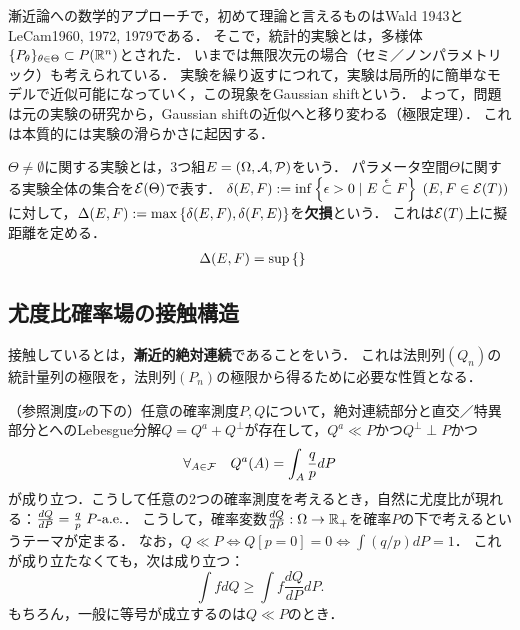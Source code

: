 \documentclass[uplatex,dvipdfmx]{jsreport}
\begin{document}
\begin{history}
    漸近論への数学的アプローチで，初めて理論と言えるものはWald 1943とLeCam1960, 1972, 1979である．
    そこで，統計的実験とは，多様体$\{P_\theta\}_{\theta\in\Theta}\subset P(\mathbb{R}^n)$とされた．
    いまでは無限次元の場合（セミ／ノンパラメトリック）も考えられている．
    実験を繰り返すにつれて，実験は局所的に簡単なモデルで近似可能になっていく，この現象をGaussian shiftという．
    よって，問題は元の実験の研究から，Gaussian shiftの近似へと移り変わる（極限定理）．
    これは本質的には実験の滑らかさに起因する．
\end{history}

\begin{definition}
    $\Theta\ne\emptyset$に関する実験とは，3つ組$E=(\Omega,\mathcal{A},\mathcal{P})$をいう．
    パラメータ空間$\Theta$に関する実験全体の集合を$\mathcal{E}(\Theta)$で表す．
    $\delta(E,F):=\inf\left\{\epsilon>0\mid E\overset{\epsilon}{\subset} F\right\}\;(E,F\in\mathcal{E}(T))$に対して，$\Delta(E,F):=\max\left\{\delta(E,F),\delta(F,E)\right\}$を\textbf{欠損}という．
    これは$\mathcal{E}(T)$上に擬距離を定める．
    \begin{align*}
        \Delta(E,F)&=\sup\left\{\right\}
    \end{align*}
\end{definition}

\subsection{尤度比確率場の接触構造}

\begin{tcolorbox}[colframe=ForestGreen, colback=ForestGreen!10!white,breakable,colbacktitle=ForestGreen!40!white,coltitle=black,fonttitle=\bfseries\sffamily,
title=]
    接触しているとは，\textbf{漸近的絶対連続}であることをいう．
    これは法則列$(Q_n)$の統計量列の極限を，法則列$(P_n)$の極限から得るために必要な性質となる．
\end{tcolorbox}

\begin{motivation}
    （参照測度$\nu$の下の）任意の確率測度$P,Q$について，絶対連続部分と直交／特異部分とへのLebesgue分解$Q=Q^a+Q^\perp$が存在して，$Q^a\ll P$かつ$Q^\perp\perp P$かつ
    \[\forall_{A\in\mathcal{F}}\quad Q^a(A)=\int_A\frac{q}{p}dP\]
    が成り立つ．こうして任意の2つの確率測度を考えるとき，自然に尤度比が現れる：$\frac{dQ}{dP}=\frac{q}{p}\;P\text{-a.e.}$．
    こうして，確率変数$\frac{dQ}{dP}:\Omega\to\mathbb{R}_+$を確率$P$の下で考えるというテーマが定まる．
    なお，$Q\ll P\Leftrightarrow Q[p=0]=0\Leftrightarrow \int(q/p)dP=1$．
    これが成り立たなくても，次は成り立つ：
    \[\int fdQ\ge\int f\frac{dQ}{dP}dP.\]
    もちろん，一般に等号が成立するのは$Q\ll P$のとき．
\end{motivation}
\end{document}
